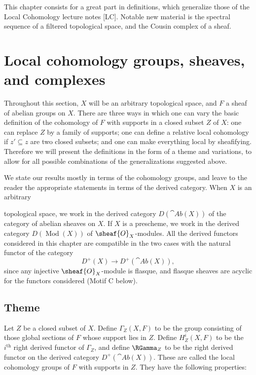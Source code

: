 This chapter consists for a great part in definitions, which generalize those of the Local Cohomology lecture notes [LC]. Notable new material is the spectral sequence of a filtered topological space, and the Cousin complex of a sheaf.

\section{Local cohomology groups, sheaves, and complexes}

Throughout this section, \(X\) will be an arbitrary topological space, and \(F\) a sheaf of abelian groups on \(X\). There are three ways in which one can vary the basic definition of the cohomology of \(F\) with supports in a closed subset \(Z\) of \(X\): one can replace \(Z\) by a family of supports; one can define a relative local cohomology if \(z' \subseteq z\) are two closed subsets; and one can make everything local by sheafifying. Therefore we will present the definitions in the form of a theme and variations, to allow for all possible combinations of the generalizations suggested above.

We state our results mostly in terms of the cohomology groups, and leave to the reader the appropriate statements in terms of the derived category. When \(X\) is an arbitrary

\setcounter{page}{216}
topological space, we work in the derived category \(D(\cat{Ab}(X))\) of the category of abelian sheaves on \(X\). If \(X\) is a prescheme, we work in the derived category \(D(\operatorname{Mod}(X))\) of \(\sheaf{O}_X\)-modules. All the derived functors considered in this chapter are compatible in the two cases with the natural functor of the category
\[D^{+}(X) \to D^{+}(\cat{Ab}(X)),\]
since any injective \(\sheaf{O}_X\)-module is flasque, and flasque sheaves are acyclic for the functors considered (Motif C below).

\subsection{Theme}
Let \(Z\) be a closed subset of \(X\). Define \(\Gamma_{Z}(X, F)\) to be the group consisting of those global sections of \(F\) whose support lies in \(Z\). Define \(H_{Z}^{i}(X, F)\) to be the \(i^{\text{th}}\) right derived functor of \(\Gamma_{Z}\), and define \(\RGamma_{Z}\) to be the right derived functor on the derived category \(D^{+}(\cat{Ab}(X))\). These are called the local cohomology groups of \(F\) with supports in \(Z\). They have the following properties:

